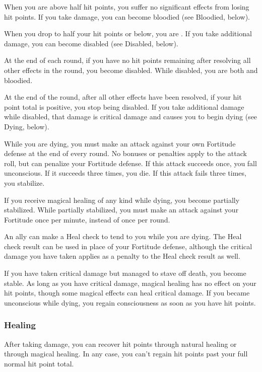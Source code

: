  When you are above half hit points, you suffer no significant effects from losing hit points.
If you take damage, you can become bloodied (see Bloodied, below).

 When you drop to half your hit points or below, you are \bloodied.
If you take additional damage, you can become disabled (see Disabled, below).

\label{Disabled} At the end of each round, if you have no hit points remaining after resolving all other effects in the round, you become disabled.
While disabled, you are both \staggered and bloodied.

At the end of the round, after all other effects have been resolved, if your hit point total is positive, you stop being disabled.
If you take additional damage while disabled, that damage is critical damage and causes you to begin dying (see Dying, below).

\label{Dying} While you are dying, you must make an attack against your own Fortitude defense at the end of every round.
No bonuses or penalties apply to the attack roll, but  can penalize your Fortitude defense.
If this attack succeeds once, you fall unconscious.
If it succeeds three times, you die.
If this attack fails three times, you stabilize.

If you receive magical healing of any kind while dying, you become partially stabilized.
While partially stabilized, you must make an attack against your Fortitude once per minute, instead of once per round.

An ally can make a Heal check to tend to you while you are dying.
The Heal check result can be used in place of your Fortitude defense, although the critical damage you have taken applies as a penalty to the Heal check result as well.

\label{Stable}
If you have taken critical damage but managed to stave off death, you become stable.
As long as you have critical damage, magical healing has no effect on your hit points, though some magical effects can heal critical damage.
If you became unconscious while dying, you regain consciousness as soon as you have hit points.

\subsubsection{Healing}
After taking damage, you can recover hit points through natural healing or through magical healing.
In any case, you can't regain hit points past your full normal hit point total.

